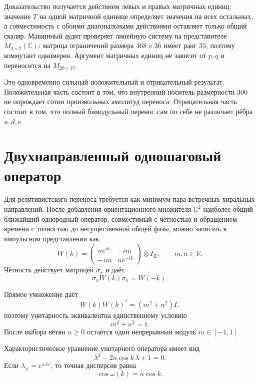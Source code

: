 Доказательство получается действием левых и правых матричных единиц:
значение $T$ на одной матричной единице определяет значения на всех
остальных, а совместимость с обоими диагональными действиями оставляет
только общий скаляр. Машинный аудит проверяет линейную систему на
представителе $M_{3\times2}(\mathbb C)$: матрица ограничений размера
$468\times36$ имеет ранг $35$, поэтому коммутант одномерен. Аргумент
матричных единиц не зависит от $p,q$ и переносится на $M_{20\times15}$.

Это одновременно сильный положительный и отрицательный результат.
Положительная часть состоит в том, что внутренний носитель размерности
$300$ не порождает сотни произвольных амплитуд переноса. Отрицательная
часть состоит в том, что полный бимодульный перенос сам по себе не различает
рёбра $u,d,e$.

\section{Двухнаправленный одношаговый оператор}

Для релятивистского переноса требуется как минимум пара встречных
хиральных направлений. После добавления ориентационного множителя
$\mathbb C^2$ наиболее общий ближайший однородный оператор, совместимый с
чётностью и обращением времени с точностью до несущественной общей фазы,
можно записать в импульсном представлении как
\begin{equation}
 W(k)=
 \begin{pmatrix}
  n e^{ik} & -im\\
  -im & n e^{-ik}
 \end{pmatrix}\otimes I_E,
 \qquad m,n\in\mathbb R.
 \label{eq:v5-minimal-dirac-walk}
\end{equation}
Чётность действует матрицей $\sigma_x$ и даёт
\begin{equation}
 \sigma_xW(k)\sigma_x=W(-k).
\end{equation}

Прямое умножение даёт
\begin{equation}
 W(k)W(k)^*=(m^2+n^2)I,
\end{equation}
поэтому унитарность эквивалентна единственному условию
\begin{equation}
 m^2+n^2=1.
 \label{eq:v5-transfer-unit-circle}
\end{equation}
После выбора ветви $n\ge0$ остаётся один непрерывный модуль
$m\in[-1,1]$.

Характеристическое уравнение унитарного оператора имеет вид
\begin{equation}
 \lambda^2-2n\cos k\,\lambda+1=0.
\end{equation}
Если $\lambda_\pm=e^{\pm i\omega}$, то точная дисперсия равна
\begin{equation}
 \cos\omega(k)=n\cos k.
 \label{eq:v5-transfer-dispersion}
\end{equation}

